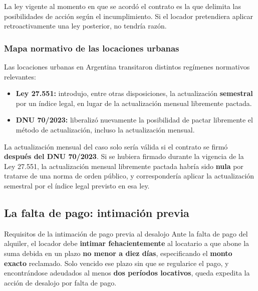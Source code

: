 \documentclass[12pt,oneside]{book}
\begin{document}
La ley vigente al momento en que se acordó el contrato es la que
delimita las posibilidades de acción según el incumplimiento. Si el
locador pretendiera aplicar retroactivamente una ley posterior, no
tendría razón.

\subsubsection{Mapa normativo de las locaciones urbanas}

Las locaciones urbanas en Argentina transitaron distintos regímenes
normativos relevantes:

\begin{itemize}
    \item \textbf{Ley 27.551:} introdujo, entre otras disposiciones, la
    actualización \textbf{semestral} por un índice legal, en lugar de
    la actualización mensual libremente pactada.
    \item \textbf{DNU 70/2023:} liberalizó nuevamente la posibilidad de
    pactar libremente el método de actualización, incluso la actualización
    mensual.
\end{itemize}

\begin{important}
La actualización mensual del caso solo sería válida si el contrato se
firmó \textbf{después del DNU 70/2023}. Si se hubiera firmado durante
la vigencia de la Ley 27.551, la actualización mensual libremente
pactada habría sido \textbf{nula} por tratarse de una norma de orden
público, y correspondería aplicar la actualización semestral por el
índice legal previsto en esa ley.
\end{important}

\subsection{La falta de pago: intimaci\'on previa}

\begin{normref}{Requisitos de la intimación de pago previa al desalojo}
Ante la falta de pago del alquiler, el locador debe \textbf{intimar
fehacientemente} al locatario a que abone la suma debida en un plazo
\textbf{no menor a diez días}, especificando el \textbf{monto exacto}
reclamado. Solo vencido ese plazo sin que se regularice el pago, y
encontrándose adeudados al menos \textbf{dos períodos locativos}, queda
expedita la acción de desalojo por falta de pago.
\end{normref}
\end{document}
